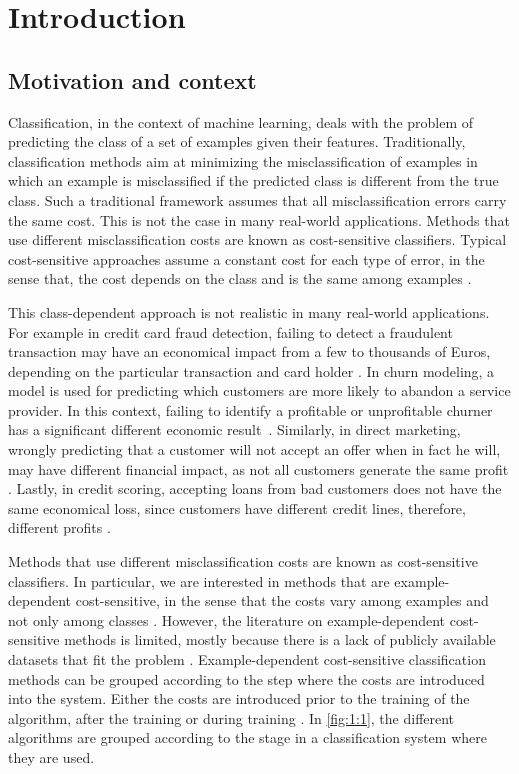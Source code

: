 \chapter{Introduction}\label{ch:1}

\section{Motivation and context}

  Classification, in the context of machine learning, deals with the problem of 
  predicting the class of a set of examples given their features. Traditionally, classification 
  methods aim at minimizing the misclassification of examples in which an example is 
  misclassified if the predicted class is different from the true class. Such a traditional 
  framework assumes that all misclassification errors carry the same cost. This is not the case in 
  many real-world applications. Methods that use different misclassification costs are known as 
  cost-sensitive classifiers. Typical cost-sensitive approaches assume a constant cost for each 
  type of error, in the sense that, the cost depends on the class and is the same among examples 
  \citep{Elkan2001,Kim2012}. 
  
  This class-dependent approach is not realistic in many real-world applications. For 
  example in credit card fraud detection, failing to detect a fraudulent transaction may have an 
  economical impact from a few to thousands of Euros, depending on the particular transaction and 
  card holder \citep{Ngai2011a}. In churn modeling, a model is used for predicting which
  customers are more likely to abandon a service provider. In this context, failing to identify a 
  profitable or unprofitable churner has a significant different economic 
  result~\citep{Verbraken2013}. Similarly, in direct marketing, wrongly predicting that a customer 
  will not accept an offer when in fact he will, may have different financial impact, as not all 
  customers generate the same profit \citep{Zadrozny2003}. Lastly, in credit scoring, accepting 
  loans from bad customers does not have the same economical loss, since customers have different 
  credit lines, therefore, different profits \citep{Verbraken2014}.
  
  Methods that use different misclassification costs are known as cost-sensitive classifiers. In 
  particular, we are interested in methods that are example-dependent cost-sensitive, in the sense 
  that the costs vary among examples and not only among classes \citep{Elkan2001}. However, the 
  literature on example-dependent cost-sensitive methods is limited, mostly because there is a 
  lack of publicly available datasets that fit the problem \citep{MacAodha2013}.
  Example-dependent cost-sensitive classification methods can be grouped according to the step 
  where the costs are introduced into the system. Either the costs are introduced prior to the 
  training of the algorithm, after the training or during training \citep{Wang2013}. In 
  \figurename{ \ref{fig:1:1}}, the different algorithms are grouped according to the stage in a 
  classification system where they are used.
  
